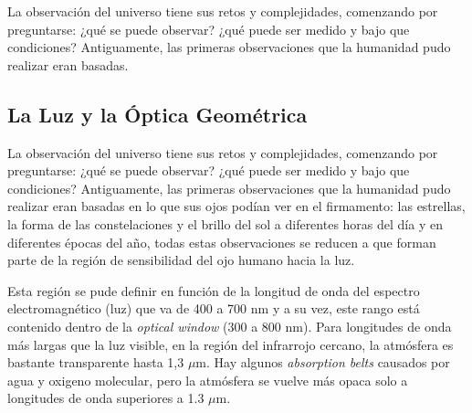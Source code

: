 La observación del universo tiene sus retos y complejidades, comenzando por preguntarse: ¿qué se puede observar? ¿qué puede ser medido y bajo que condiciones? Antiguamente, las primeras observaciones que la humanidad pudo realizar eran basadas. 



\subsection*{La Luz y la Óptica Geométrica}

La observación del universo tiene sus retos y complejidades, comenzando por preguntarse: ¿qué se puede observar? ¿qué puede ser medido y bajo que condiciones? Antiguamente, las primeras observaciones que la humanidad pudo realizar eran basadas en lo que sus ojos podían ver en el firmamento: las estrellas, la forma de las constelaciones y el brillo del sol a diferentes horas del día y en diferentes épocas del año, todas estas observaciones se reducen a que forman parte de la región de sensibilidad del ojo humano hacia la luz.

Esta región se pude definir en función de la longitud de onda del espectro electromagnético (luz) que va de 400 a 700 nm y a su vez, este rango está contenido dentro de la \textit{optical window} (300 a 800 nm). Para longitudes de onda más largas que la luz visible, en la región del infrarrojo cercano, la atmósfera es bastante transparente hasta 1,3 $\mu$m. Hay algunos \textit{absorption belts} causados por agua y oxigeno molecular, pero la atmósfera se vuelve más opaca solo a longitudes de onda superiores a 1.3 $\mu$m.





\cleardoublepage
